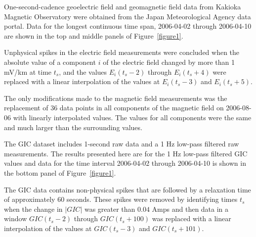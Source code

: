 \documentclass[draft,linenumbers]{agujournal2018}
\begin{document}
One-second-cadence geoelectric field and geomagnetic field data from Kakioka Magnetic Observatory were obtained from the Japan Meteorological Agency data portal. Data for the longest continuous time span, 2006-04-02 through 2006-04-10 are shown in the top and middle panels of Figure~\ref{figure1}.

Unphysical spikes in the electric field measurements were concluded when the absolute value of a component $i$ of the electric field changed by more than 1 mV/km at time $t_s$, and the values $E_i(t_s-2)$ through $E_i(t_s+4)$ were replaced with a linear interpolation of the values at $E_i(t_s-3)$ and $E_i(t_s + 5)$.

The only modifications made to the magnetic field measurements was the replacement of 36 data points in all components of the magnetic field on 2006-08-06 with linearly interpolated values. The values for all components were the same and much larger than the surrounding values.

The GIC dataset includes 1-second raw data and a 1 Hz low-pass filtered raw measurements.  The results presented here are for the 1 Hz low-pass filtered GIC values and data for the time interval 2006-04-02 through 2006-04-10 is shown in the bottom panel of Figure~\ref{figure1}.

The GIC data contains non-physical spikes that are followed by a relaxation time of approximately 60 seconds. These spikes were removed by identifying times $t_s$ when the change in $|GIC|$ was greater than $0.04$ Amps and then data in a window $GIC(t_s-2)$ through $GIC(t_s+100)$ was replaced with a linear interpolation of the values at $GIC(t_s-3)$ and $GIC(t_s + 101)$.
\end{document}
